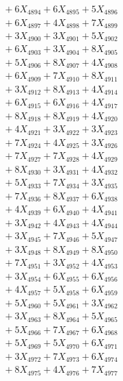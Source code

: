 \documentclass[a4paper,10pt]{article}
\begin{document}
{\begin{align}
&\;  + 6 X_{4894} + 6 X_{4895} + 5 X_{4896} \\[0.3ex]
&\;  + 6 X_{4897} + 4 X_{4898} + 7 X_{4899} \\[0.5ex]\allowbreak
&\;  + 3 X_{4900} + 3 X_{4901} + 5 X_{4902} \\[0.3ex]
&\;  + 6 X_{4903} + 3 X_{4904} + 8 X_{4905} \\[0.3ex]
&\;  + 5 X_{4906} + 8 X_{4907} + 4 X_{4908} \\[0.3ex]
&\;  + 6 X_{4909} + 7 X_{4910} + 8 X_{4911} \\[0.3ex]
&\;  + 3 X_{4912} + 8 X_{4913} + 4 X_{4914} \\[0.3ex]
&\;  + 6 X_{4915} + 6 X_{4916} + 4 X_{4917} \\[0.3ex]
&\;  + 8 X_{4918} + 8 X_{4919} + 4 X_{4920} \\[0.3ex]
&\;  + 4 X_{4921} + 3 X_{4922} + 3 X_{4923} \\[0.3ex]
&\;  + 7 X_{4924} + 4 X_{4925} + 3 X_{4926} \\[0.3ex]
&\;  + 7 X_{4927} + 7 X_{4928} + 4 X_{4929} \\[0.5ex]\allowbreak
&\;  + 8 X_{4930} + 3 X_{4931} + 4 X_{4932} \\[0.3ex]
&\;  + 5 X_{4933} + 7 X_{4934} + 3 X_{4935} \\[0.3ex]
&\;  + 7 X_{4936} + 8 X_{4937} + 6 X_{4938} \\[0.3ex]
&\;  + 4 X_{4939} + 6 X_{4940} + 4 X_{4941} \\[0.3ex]
&\;  + 3 X_{4942} + 4 X_{4943} + 4 X_{4944} \\[0.3ex]
&\;  + 3 X_{4945} + 7 X_{4946} + 5 X_{4947} \\[0.3ex]
&\;  + 3 X_{4948} + 8 X_{4949} + 8 X_{4950} \\[0.3ex]
&\;  + 7 X_{4951} + 3 X_{4952} + 4 X_{4953} \\[0.3ex]
&\;  + 3 X_{4954} + 6 X_{4955} + 6 X_{4956} \\[0.3ex]
&\;  + 4 X_{4957} + 5 X_{4958} + 6 X_{4959} \\[0.5ex]\allowbreak
&\;  + 5 X_{4960} + 5 X_{4961} + 3 X_{4962} \\[0.3ex]
&\;  + 3 X_{4963} + 8 X_{4964} + 5 X_{4965} \\[0.3ex]
&\;  + 5 X_{4966} + 7 X_{4967} + 6 X_{4968} \\[0.3ex]
&\;  + 5 X_{4969} + 5 X_{4970} + 6 X_{4971} \\[0.3ex]
&\;  + 3 X_{4972} + 7 X_{4973} + 6 X_{4974} \\[0.3ex]
&\;  + 8 X_{4975} + 4 X_{4976} + 7 X_{4977} \\[0.3ex]

\end{align}}
\end{document}
